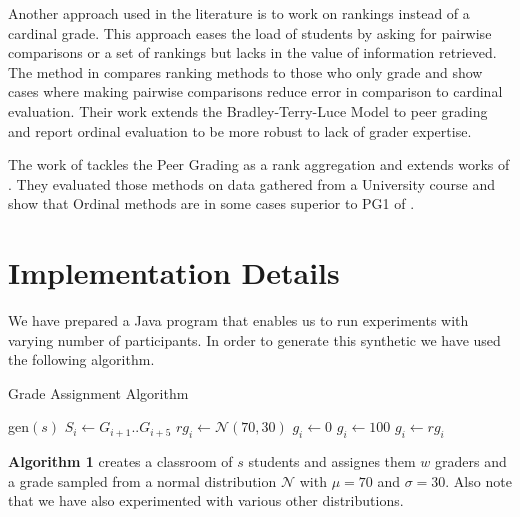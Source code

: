\documentclass[a4paper]{article}
\begin{document}
	Another approach used in the literature is to work on rankings instead of a cardinal grade.
This approach eases the load of students by asking for pairwise comparisons or a set of rankings 
but lacks in the value of information retrieved. The method in \cite{Shah13} compares ranking 
methods to those who only grade and show cases where making pairwise comparisons reduce error in 
comparison to cardinal evaluation. Their work extends the Bradley-Terry-Luce Model 
\cite{BT52,luce60} to peer grading and report ordinal evaluation to be more robust to lack of 
grader expertise.

The work of \cite{RamanJ14} tackles the Peer Grading as a rank aggregation and extends works of 
\cite{BT52,citeulike:7065887,PL,thurstone1927method}. They evaluated those methods on data 
gathered from a University course and show that Ordinal methods are in some cases superior to 
PG1 of \cite{PiechHCDNK13}.
\section{Implementation Details}
	We have prepared a Java program that enables us to run experiments with varying number of 
participants. In order to generate this synthetic we have used the following algorithm.\\
    
\begin{algorithm}
  \caption{Grade Assignment Algorithm}
  \label{alg:alg1}
  \begin{algorithmic}
    \State gen$(s)$	
    \State$S_i \gets G_{i+1} .. G_{i+5}$    
   		\State$rg_i\gets \mathcal{N}(70,30)$ 
           \State $g_i\gets 0$
           \State $g_i\gets 100$
        \Else
            \State $g_i \gets rg_i$
        \EndIf
    \EndFor
  \end{algorithmic}
\end{algorithm}

\textbf{Algorithm 1} creates a classroom of $s$ students and assignes them $w$ graders and a
grade sampled from a normal distribution $\mathcal{N}$ with $\mu=70$ and $\sigma=30$. Also note that we have
also experimented with various other distributions.
\end{document}
